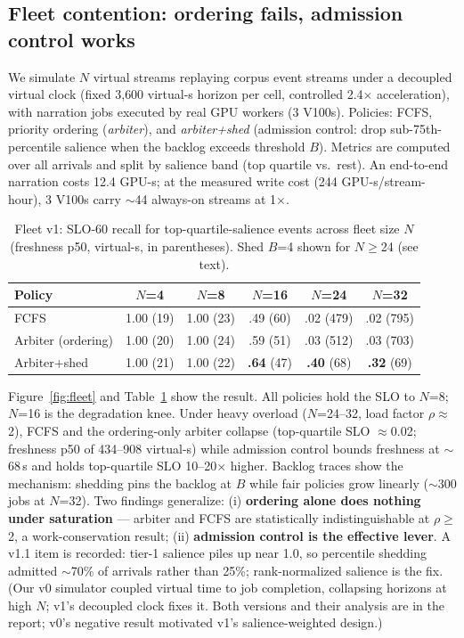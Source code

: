 \subsection{Fleet contention: ordering fails, admission control works}
\label{sec:exp-fleet}

We simulate $N$ virtual streams replaying corpus event streams under a decoupled virtual clock (fixed 3{,}600 virtual-s horizon per cell, controlled 2.4$\times$ acceleration), with narration jobs executed by real GPU workers (3 V100s). Policies: FCFS, priority ordering (\emph{arbiter}), and \emph{arbiter+shed} (admission control: drop sub-75th-percentile salience when the backlog exceeds threshold $B$). Metrics are computed over all arrivals and split by salience band (top quartile vs.\ rest). An end-to-end narration costs 12.4 GPU-s; at the measured write cost (244 GPU-s/stream-hour), 3 V100s carry $\sim$44 always-on streams at 1$\times$.

\begin{table}[h]
\centering
\caption{Fleet v1: SLO-60 recall for top-quartile-salience events across fleet size $N$ (freshness p50, virtual-s, in parentheses). Shed $B$=4 shown for $N\ge$24 (see text).}
\label{tab:fleet}
\small
\begin{tabular}{@{}lccccc@{}}
\toprule
Policy & $N$=4 & $N$=8 & $N$=16 & $N$=24 & $N$=32 \\
\midrule
FCFS & 1.00 (19) & 1.00 (23) & .49 (60) & .02 (479) & .02 (795) \\
Arbiter (ordering) & 1.00 (20) & 1.00 (24) & .59 (51) & .03 (512) & .03 (703) \\
Arbiter+shed & 1.00 (21) & 1.00 (22) & \textbf{.64} (47) & \textbf{.40} (68) & \textbf{.32} (69) \\
\bottomrule
\end{tabular}
\end{table}

Figure~\ref{fig:fleet} and Table~\ref{tab:fleet} show the result. All policies hold the SLO to $N$=8; $N$=16 is the degradation knee. Under heavy overload ($N$=24--32, load factor $\rho\approx$2), FCFS and the ordering-only arbiter collapse (top-quartile SLO $\approx$0.02; freshness p50 of 434--908 virtual-s) while admission control bounds freshness at $\sim$68\,s and holds top-quartile SLO 10--20$\times$ higher. Backlog traces show the mechanism: shedding pins the backlog at $B$ while fair policies grow linearly ($\sim$300 jobs at $N$=32). Two findings generalize: (i) \textbf{ordering alone does nothing under saturation} --- arbiter and FCFS are statistically indistinguishable at $\rho\ge$2, a work-conservation result; (ii) \textbf{admission control is the effective lever}. A v1.1 item is recorded: tier-1 salience piles up near 1.0, so percentile shedding admitted $\sim$70\% of arrivals rather than 25\%; rank-normalized salience is the fix. (Our v0 simulator coupled virtual time to job completion, collapsing horizons at high $N$; v1's decoupled clock fixes it. Both versions and their analysis are in the report; v0's negative result motivated v1's salience-weighted design.)

